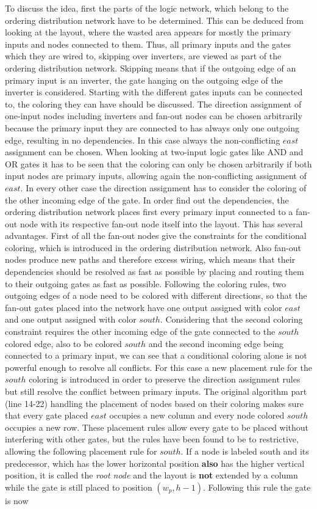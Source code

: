 To discuss the idea, first the parts of the logic network, which belong to the ordering distribution network have to be determined. This can be deduced from looking at the layout, where the wasted area appears for mostly the primary inputs and nodes connected to them. Thus, all primary inputs and the gates which they are wired to, skipping over inverters, are viewed as part of the ordering distribution network. Skipping means that if the outgoing edge of an primary input is an inverter, the gate hanging on the outgoing edge of the inverter is considered. Starting with the different gates inputs can be connected to, the coloring they can have should be discussed. The direction assignment of one-input nodes including inverters and fan-out nodes can be chosen arbitrarily because the primary input they are connected to has always only one outgoing edge, resulting in no dependencies. In this case always the non-conflicting $east$ assignment can be chosen. When looking at two-input logic gates like AND and OR gates it has to be seen that the coloring can only be chosen arbitrarily if both input nodes are primary inputs, allowing again the non-conflicting assignment of $east$. In every other case the direction assignment has to consider the coloring of the other incoming edge of the gate. In order find out the dependencies, the ordering distribution network places first every primary input connected to a fan-out node with its respective fan-out node itself into the layout. This has several advantages. First of all the fan-out nodes give the constraints for the conditional coloring, which is introduced in the ordering distribution network. Also fan-out nodes produce new paths and therefore excess wiring, which means that their dependencies should be resolved as fast as possible by placing and routing them to their outgoing gates as fast as possible. Following the coloring rules, two outgoing edges of a node need to be colored with different directions, so that the fan-out gates placed into the network have one output assigned with color $east$ and one output assigned with color $south$. Considering that the second coloring constraint requires the other incoming edge of the gate connected to the $south$ colored edge, also to be colored $south$ and the second incoming edge being connected to a primary input, we can see that a conditional coloring alone is not powerful enough to resolve all conflicts. For this case a new placement rule for the $south$ coloring is introduced in order to preserve the direction assignment rules but still resolve the conflict between primary inputs. The original algorithm part (line 14-22) handling the placement of nodes based on their coloring makes sure that every gate placed $east$ occupies a new column and every node colored $south$ occupies a new row. These placement rules allow every gate to be placed without interfering with other gates, but the rules have been found to be to restrictive, allowing the following placement rule for $south$. If a node is labeled south and its predecessor, which has the lower horizontal position \textbf{also} has the higher vertical position, it is called the \textit{root node} and the layout is \textbf{not} extended by a column while the gate is still placed to position $(w_p, h-1)$. Following this rule the gate is now 